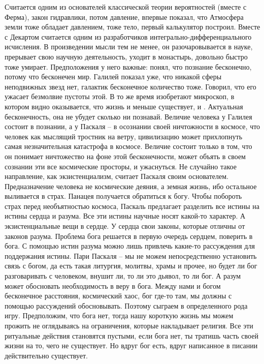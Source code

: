 \documentclass[a4paper, 12pt]{article}
\begin{document}
Считается одним из основателей классической теории вероятностей (вместе 
с Ферма), закон гидравлики, потом давление, впервые показал, что 
Атмосфера земли тоже обладает давлением, тоже тело, первый калькулятор 
построил. Вместе с Декартом считается одним из разработчиков 
интегрально-дифференциального исчисления. В произведении мысли тем не 
менее, он разочаровывается в науке, прерывает свою научную деятельность, 
уходит в монастырь, довольно быстро тоже умирает. Предположения у него 
важные: понял, что познание бесконечно, потому что бесконечен мир. 
Галилей показал уже, что никакой сферы неподвижных звезд нет, галактик 
бесконечное количество тоже. Говорил, что его ужасает безмолвие пустоты 
этой. В то же время изобретают микроскоп, в котором видно оказывается, 
что жизнь и меньше существует, и . Актуальная бесконечность, она не 
убудет сколько ни познавай. Величие человека у Галилея состоит 
в познании, а у Паскаля -- в осознании своей ничтожности в космосе, что 
человек как мыслящий тростник на ветру, цивилизацию может прихлопнуть 
самая незначительная катастрофа в космосе. Величие состоит только в том, 
что он понимает ничтожество на фоне этой бесконечности, может объять 
в своем сознании эти все космические просторы, и ужаснуться. Не случайно 
такое направление, как экзистенциализм, считает Паскаля своим 
основателем. Предназначение человека не космические деяния, а земная 
жизнь, ибо остальное выливается в страх. Панацея получается обратиться 
к богу. Чтобы побороть страх перед необъятностью космоса, Паскаль 
предлагает разделить все истины на истины сердца и разума. Все эти 
истины научные носят какой-то характер. А экзистенциальные вещи 
в сердце. У сердца свои законы, которые отличны от законов разума. 
Проблема бога решается в первую очередь сердцем, поверить в бога. 
С помощью истин разума можно лишь привлечь какие-то рассуждения для 
поддержания истины. Пари Паскаля -- мы не можем непосредственно 
установить связь с богом, да есть такая литургия, молитвы, храмы 
и прочее, но будет ли бог разговаривать с человеком, внушит ли, то ли 
это дьявол, то ли бог. А разум может обосновать необходимость в веру 
в бога. Между нами и богом бесконечное расстояния, космический хаос, бог 
где-то там, мы должны с помощью рассуждений обосновывать. Поэтому 
сыграем в определенного рода игру. Предположим, что бога нет, тогда нашу 
короткую жизнь мы можем прожить не оглядываясь на ограничения, которые 
накладывает религия. Все эти ритуальные действия становятся пустыми, 
если бога нет, ты тратишь часть своей жизни на то, чего не существует. 
Но вдруг бог есть, вдруг написанное в писании действительно существует. 
\end{document}
